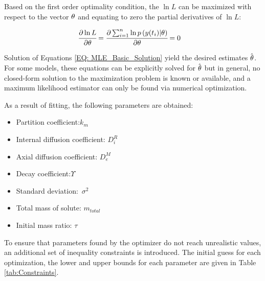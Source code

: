 \documentclass[../Article_Sensitivity_Analsysis.tex]{subfiles}
\begin{document}
	Based on the first order optimality condition, the $\ln L$ can be maximized with respect to the vector ${\color{black} \theta}$ and equating to zero the partial derivatives of $\ln L$:
	
	{\footnotesize
		\begin{align}\label{EQ: MLE_Basic_Solution}
			\cfrac{\partial \ln L}{\partial {\color{black} \theta}} &= \cfrac{\partial \sum_{i=1}^{n} \ln p\left( {\color{black}y}(t_i) | {\color{black} \theta} \right) }{\partial {\color{black} \theta}} = 0 
	\end{align} }
	
	Solution of Equations \ref{EQ: MLE_Basic_Solution} yield the desired estimates $\hat{{\color{black} \theta}}$. For some models, these equations can be explicitly solved for $\hat{{\color{black} \theta}}$ but in general, no closed-form solution to the maximization problem is known or available, and a maximum likelihood estimator can only be found via numerical optimization.
	
	As a result of fitting, the following parameters are obtained:
	
	\begin{itemize}
		\item Partition coefficient:\qquad\quad\qquad$k_m$
		\item Internal diffusion coefficient: \quad$D_i^R$
		\item Axial diffusion coefficient: \qquad$D_e^M$
		\item Decay coefficient:\qquad\qquad\qquad$\Upsilon$
		\item Standard deviation:\qquad\qquad\quad~$\sigma^2$
		\item Total mass of solute: \qquad\quad\quad$m_{total}$
		\item Initial mass ratio: \qquad\qquad\qquad$\tau$
	\end{itemize}
	
	To ensure that parameters found by the optimizer do not reach unrealistic values, an additional set of inequality constraints is introduced. The initial guess for each optimization, the lower and upper bounds for each parameter are given in Table \ref{tab:Constraints}. 
 	
 	\begin{table}[h]
		\caption{Constraints and initial guess}
		\label{tab:Constraints}
	\end{table}
	
\end{document}

